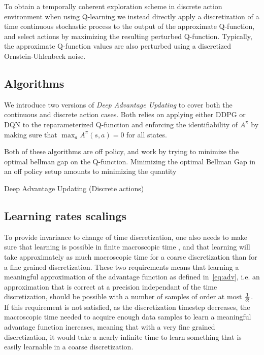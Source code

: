 \documentclass{article}
\begin{document}
To obtain a temporally coherent exploration scheme in discrete action environment
when using Q-learning we instead directly apply a discretization of a time continuous
stochastic process to the output of the approximate Q-function, and select actions
by maximizing the resulting perturbed Q-function. Typically, the approximate Q-function
values are also perturbed using a discretized Ornstein-Uhlenbeck noise.

\subsection{Algorithms}
\label{subsec:algorithm}
We introduce two versions of \emph{Deep Advantage Updating} to cover both the
continuous and discrete action cases. Both relies on applying either DDPG or DQN
to the reparameterized Q-function and enforcing the identifiability of $A^\pi$ by
making sure that $\max_a A^\pi(s, a) = 0$ for all states.

Both of these algorithms are off policy, and work by trying to minimize the
optimal bellman gap on the Q-function. Minimizing the optimal Bellman Gap in
an off policy setup amounts to minimizing the quantity
\begin{algorithm}[ht]
	\caption{Deep Advantage Updating (Discrete actions)}
	
\end{algorithm}

\subsection{Learning rates scalings}
\label{subsec:lr}
To provide invariance to change of time discretization, one also needs to make
sure that learning is possible in finite macroscopic time , and that learning
will take approximately as much macroscopic time for a coarse discretization than
for a fine grained discretization. These two requirements means that learning a
meaningful approximation of the advantage function as defined in~\ref{eq:adv},
i.e. an approximation that is correct at a precision independant of the time
discretization, should be possible with a number of samples of order at most
$\frac{1}{\delta\hspace{-.1em}t}$. If this requirement is not satisfied, as the
discretization timestep decreases, the macroscopic time needed to acquire
enough data samples to learn a meaningful advantage function increases, meaning
that with a very fine grained discretization, it would take a nearly infinite
time to learn something that is easily learnable in a coarse discretization. 
\end{document}
